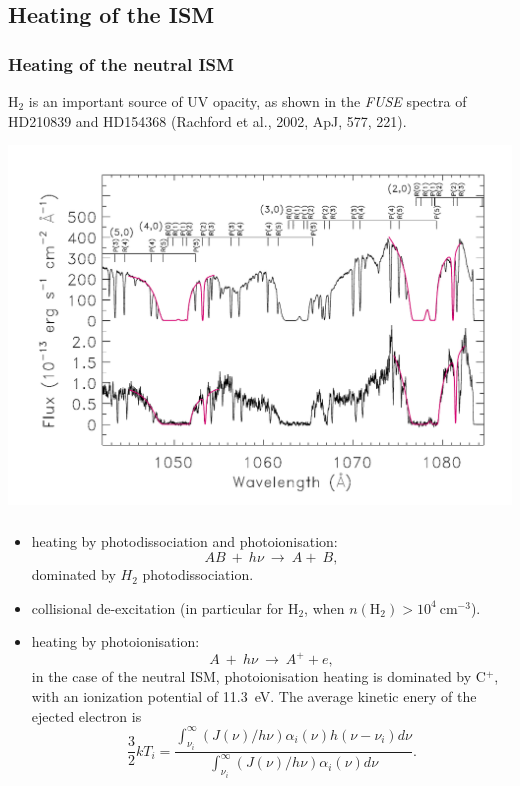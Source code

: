 \subsection{Heating of the ISM}

 \begin{frame}\frametitle{Heating of the neutral ISM}

H$_2$ is an important source of UV opacity, as shown in the {\em FUSE}
spectra of HD210839 and HD154368 (Rachford et al., 2002, ApJ, 577,
221).

\includegraphics[width=\textwidth,height=!]{./B/fuse_H2}
\vfill

\end{frame} \begin{frame}\frametitle{}

\begin{itemize}
\item heating by photodissociation and photoionisation: 
\[AB ~  + ~h\nu ~\rightarrow~ A +~ B, \]
dominated by  $H_2$ photodissociation. 

\item collisional de-excitation (in particular for H$_2$, when  
$n(\mathrm{H}_2) > 10^4~$cm$^{-3}$).


\item heating by photoionisation: 
\[A ~  + ~h\nu ~\rightarrow~ A^+  + e, \]
in the case of the neutral ISM, photoionisation heating is dominated
by C$^+$, with an ionization potential of 11.3~eV. The average kinetic
enery of the ejected electron is 
\[ \frac{3}{2}kT_i = \frac{\int_{\nu_i}^{\infty} (J(\nu)/h\nu) \alpha_i(\nu) h(\nu
-\nu_i) d\nu}{\int_{\nu_i}^{\infty} (J(\nu)/h\nu) \alpha_i(\nu)d\nu
 }. \]


\end{itemize}
\end{frame}
